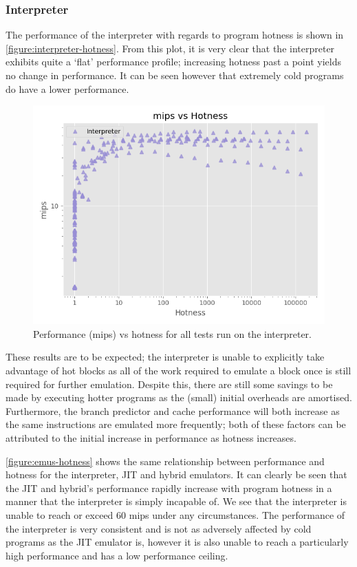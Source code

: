 \subsubsection{Interpreter}
\label{section:perf-interpreter}

The performance of the interpreter with regards to program hotness is shown in \autoref{figure:interpreter-hotness}. From this plot, it is very clear that the interpreter exhibits quite a `flat' performance profile; increasing hotness past a point yields no change in performance. It can be seen however that extremely cold programs do have a lower performance.

\begin{figure}[H]
    \centering
    \includegraphics[scale=0.75]{output/graphs/scatter/single/interpreter/hotness.png}
    \caption{Performance (mips) vs hotness for all tests run on the interpreter.}
    \label{figure:interpreter-hotness}
\end{figure}

These results are to be expected; the interpreter is unable to explicitly take advantage of hot blocks as all of the work required to emulate a block once is still required for further emulation. Despite this, there are still some savings to be made by executing hotter programs as the (small) initial overheads are amortised. Furthermore, the branch predictor and cache performance will both increase as the same instructions are emulated more frequently; both of these factors can be attributed to the initial increase in performance as hotness increases.

\autoref{figure:emus-hotness} shows the same relationship between performance and hotness for the interpreter, JIT and hybrid emulators. It can clearly be seen that the JIT and hybrid's performance rapidly increase with program hotness in a manner that the interpreter is simply incapable of. We see that the interpreter is unable to reach or exceed 60 mips under any circumstances. The performance of the interpreter is very consistent and is not as adversely affected by cold programs as the JIT emulator is, however it is also unable to reach a particularly high performance and has a low performance ceiling.

